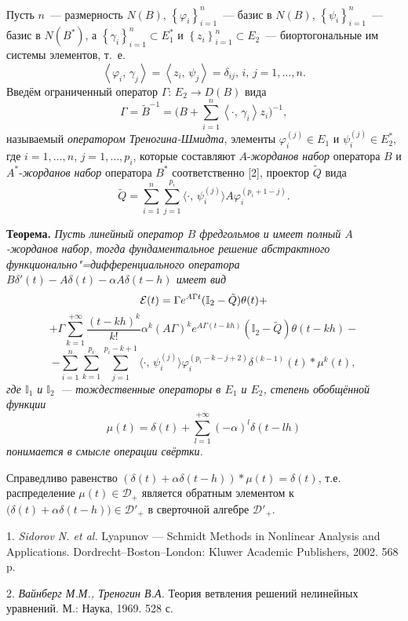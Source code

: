 Пусть $n$~--- размерность $N(B)$, $\left\{\varphi_{i}\right\}_{i=1}^{n}$~--- базис в $N(B)$, $\left\{\psi_{i}\right\}_{i=1}^{n}$~--- базис в $N(B^{\ast})$, а $\left\{\gamma_{i}\right\}_{i=1}^{n}\subset E_{1}^{\ast}$ и $\left\{z_{i}\right\}_{i=1}^{n}\subset E_{2}$~--- биортогональные им системы элементов, т.~е.
$$
\left\langle \varphi_{i},\,\gamma_{j}\right\rangle=\left\langle z_{i},\, \psi_{j}\right\rangle=\delta_{ij},\,i,\,j=1,\ldots,n.
$$
Введём ограниченный оператор $\Gamma:\,E_{2}\to D(B)$ вида
$$
\Gamma=\tilde{B}^{-1}=\biggl(B+\sum\limits_{i=1}^{n}\left\langle\cdot,\, \gamma_{i}\right\rangle z_{i}\biggr)^{-1},
$$
называемый {\it оператором Треногина\--Шмидта}, элементы $\varphi^{(j)}_{i}\in E_{1}$ и $\psi^{(j)}_{i}\in E_{2}^{\ast}$, где $i=1,\ldots,n$, $j=1,\ldots,p_{i}$, которые составляют $A$-{\it жорданов набор} оператора $B$ и $A^{*}$-{\it жорданов набор} оператора $B^{*}$ соответственно [2], проектор $\tilde{Q}$ вида
$$
\tilde{Q}=\sum\limits_{i=1}^{n}\sum\limits_{j=1}^{p_{i}}\langle\cdot,\, \psi_{i}^{(j)}\rangle A\varphi^{(p_{i}+1-j)}_{i}.
$$

\textbf{Теорема.} {\it Пусть линейный оператор $B$ фредгольмов и имеет полный $A$-жорданов набор, тогда фундаментальное решение абстрактного функционально"=дифференциального оператора $B\delta'(t)-A\delta(t)-\alpha A\delta(t-h)$ имеет вид
$$
{\cal E}(t)=\Gamma e^{A\Gamma t}({\mathbb I}_{2}-\tilde{Q})\theta(t)+
$$
$$
+\Gamma\sum\limits_{k=1}^{+\infty}\frac{(t-kh)^{k}}{k!}\alpha^{k}(A\Gamma)^k e^{A\Gamma (t-kh)}({\mathbb I}_{2}-\tilde{Q})\theta(t-kh)-
$$
$$
 -\sum\limits_{i=1}^{n}\sum\limits_{k=1}^{p_{i}}\sum\limits_{j=1}^{p_{i}-k+1}\langle\cdot,\,\psi^{(j)}_{i}\rangle\varphi^{(p_{i}-k-j+2)}_{i}\delta^{(k-1)}(t)\ast\mu^{k}(t),
$$
где ${\mathbb I}_{1}$ и ${\mathbb I}_{2}$~--- тождественные операторы в $E_{1}$ и $E_{2}$, степень обобщённой функции
$$
\mu(t)=\delta(t)+\sum\limits_{l=1}^{+\infty}(-\alpha)^{l}\delta(t-lh)
$$
понимается в смысле операции свёртки.}

Справедливо равенство $(\delta(t)+\alpha\delta(t-h))\ast\mu(t)=\delta(t)$, т.е. распределение $\mu(t)\in{\mathcal D}_{+}$ является обратным элементом к $\bigl(\delta(t)+\alpha\delta(t-h)\bigr)\in{\mathcal D}'_{+}$ в сверточной алгебре ${\mathcal D}'_{+}$.

\litlist


1. {\it Sidorov N. et al.} Lyapunov --- Schmidt Methods in Non\-linear Analysis and Applications. Dordrecht--Boston--London: Kluwer Academic Publishers, 2002. 568 p.


2. {\it Вайнберг М.М., Треногин В.А.} Теория ветвления решений нелинейных уравнений. М.: Наука, 1969. 528 с.
